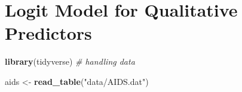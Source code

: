 \documentclass[]{book}
\newenvironment{Shaded}{\begin{snugshade}}{\end{snugshade}}
\newcommand{\CommentTok}[1]{\textcolor[rgb]{0.56,0.35,0.01}{\textit{#1}}}
\newcommand{\KeywordTok}[1]{\textcolor[rgb]{0.13,0.29,0.53}{\textbf{#1}}}
\newcommand{\NormalTok}[1]{#1}
\newcommand{\StringTok}[1]{\textcolor[rgb]{0.31,0.60,0.02}{#1}}
\begin{document}
\hypertarget{logit-model-for-qualitative-predictors}{%
\chapter{Logit Model for Qualitative Predictors}\label{logit-model-for-qualitative-predictors}}

\begin{Shaded}
\begin{Highlighting}[]
\KeywordTok{library}\NormalTok{(tidyverse) }\CommentTok{# handling data}
\end{Highlighting}
\end{Shaded}

\begin{Shaded}
\begin{Highlighting}[]
\NormalTok{aids <-}\StringTok{ }\KeywordTok{read_table}\NormalTok{(}\StringTok{"data/AIDS.dat"}\NormalTok{)}
\end{Highlighting}
\end{Shaded}
\end{document}
